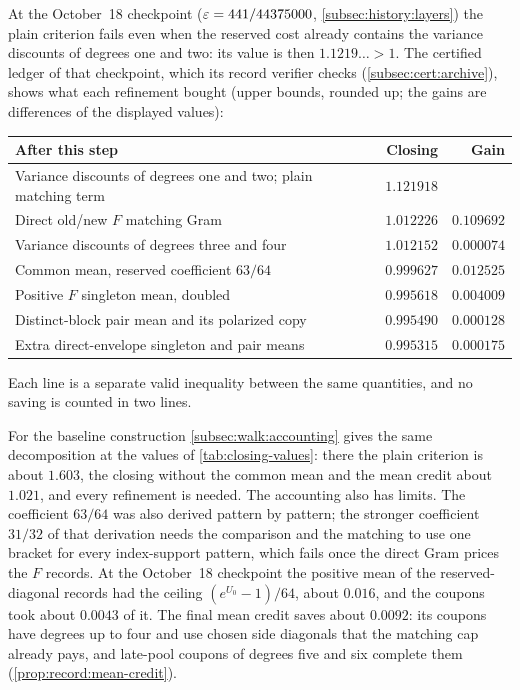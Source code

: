 \begin{remark}\label{rem:record:plain}
At the October~18 checkpoint ($\varepsilon=441/44375000$,
\cref{subsec:history:layers}) the plain criterion fails even when the reserved
cost already contains the variance discounts of degrees one and two: its value
is then $1.1219\ldots>1$. The certified ledger of that checkpoint, which its
record verifier checks (\cref{subsec:cert:archive}), shows what each refinement
bought (upper bounds, rounded up; the gains are differences of the displayed
values):
\begin{center}
\small
\begin{tabular}{@{}>{\raggedright\arraybackslash}p{}rr@{}}
\toprule
After this step & Closing & Gain\\
\midrule
Variance discounts of degrees one and two; plain matching term & $1.121918$ & \\
Direct old/new $F$ matching Gram & $1.012226$ & $0.109692$\\
Variance discounts of degrees three and four & $1.012152$ & $0.000074$\\
Common mean, reserved coefficient $63/64$ & $0.999627$ & $0.012525$\\
Positive $F$ singleton mean, doubled & $0.995618$ & $0.004009$\\
Distinct-block pair mean and its polarized copy & $0.995490$ & $0.000128$\\
Extra direct-envelope singleton and pair means & $0.995315$ & $0.000175$\\
\bottomrule
\end{tabular}
\end{center}
Each line is a separate valid inequality between the same quantities, and no saving is counted in two lines.
\end{remark}

For the baseline construction \cref{subsec:walk:accounting} gives the same
decomposition at the values of \cref{tab:closing-values}: there the plain
criterion is about $1.603$, the closing without the common mean and the mean
credit about $1.021$, and every refinement is needed. The accounting also has
limits. The
coefficient $63/64$ was also derived pattern by pattern; the stronger
coefficient $31/32$ of that derivation needs the comparison and the matching to
use one bracket for every index-support pattern, which fails once the direct Gram prices the
$F$ records. At the October~18 checkpoint the positive mean of the
reserved-diagonal records had the ceiling $(e^{U_0}-1)/64$, about $0.016$, and
the coupons took about $0.0043$ of it. The final mean credit saves about
$0.0092$: its coupons have degrees up to four and use chosen side diagonals
that the matching cap already pays, and late-pool coupons of degrees five and
six complete them (\cref{prop:record:mean-credit}).

